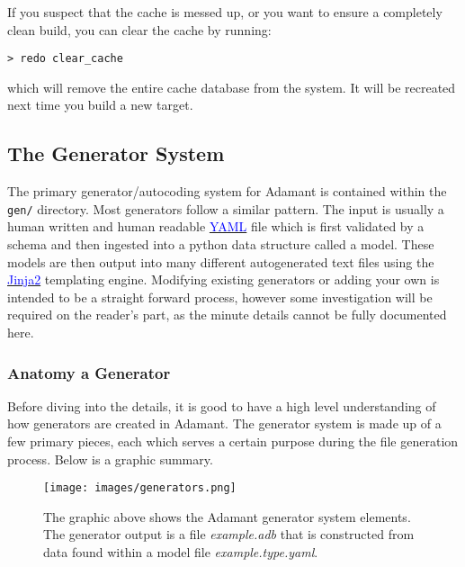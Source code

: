 If you suspect that the cache is messed up, or you want to ensure a completely clean build, you can clear the cache by running:

\vspace{5mm} %
\begin{verbatim}
> redo clear_cache
\end{verbatim}
\vspace{5mm} %

which will remove the entire cache database from the system. It will be recreated next time you build a new target.

\subsection{The Generator System} \label{Adding Generators}

The primary generator/autocoding system for Adamant is contained within the \texttt{gen/} directory. Most generators follow a similar pattern. The input is usually a human written and human readable \href{http://yaml.org}{\textcolor{blue}{YAML}} file which is first validated by a schema and then ingested into a python data structure called a model. These models are then output into many different autogenerated text files using the \href{http://jinja.pocoo.org}{\textcolor{blue}{Jinja2}} templating engine. Modifying existing generators or adding your own is intended to be a straight forward process, however some investigation will be required on the reader's part, as the minute details cannot be fully documented here.

\subsubsection{Anatomy a Generator} \label{Adding Generators}

Before diving into the details, it is good to have a high level understanding of how generators are created in Adamant. The generator system is made up of a few primary pieces, each which serves a certain purpose during the file generation process. Below is a graphic summary.

\begin{figure}[H]
  \texttt{[image: images/generators.png]}
  \caption{The graphic above shows the Adamant generator system elements. The generator output is a file \textit{example.adb} that is constructed from data found within a model file \textit{example.type.yaml}.}
\end{figure}


